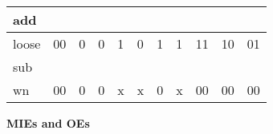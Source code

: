 \begin{enumerate}
\begin{onlysolution}[fragile]
{{\begin{tabular}{l|l|l|l|l|l|l|l|l|l|l}
                        add    &          &        &        &           &              &        &         &
                        &          &                                                                                 \\ \hline
                        loose  & 00       & 0      & 0      & 1         & 0            & 1      & 1       & 11
                        & 10       & 01                                                                              \\ \hline
                        sub    &          &        &        &           &              &        &         &
                        &          &                                                                                 \\ \hline
                        wn     & 00       & 0      & 0      & x         & x            & 0      & x       & 00
                        & 00       & 00                                                                              \\
                    \end{tabular}
            }}

            \textbf{ MIEs and OEs}


\end{onlysolution}
\end{enumerate}
